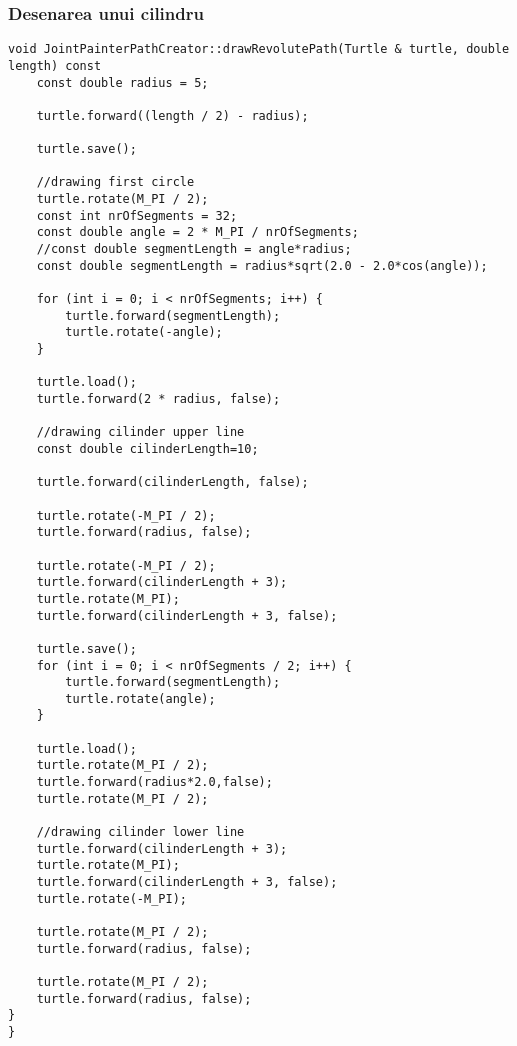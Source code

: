 \subsubsection{Desenarea unui cilindru}
\begin{lstlisting}
void JointPainterPathCreator::drawRevolutePath(Turtle & turtle, double length) const
    const double radius = 5;

    turtle.forward((length / 2) - radius);

    turtle.save();
    
    //drawing first circle
    turtle.rotate(M_PI / 2);
    const int nrOfSegments = 32;
    const double angle = 2 * M_PI / nrOfSegments;
    //const double segmentLength = angle*radius;
    const double segmentLength = radius*sqrt(2.0 - 2.0*cos(angle));

    for (int i = 0; i < nrOfSegments; i++) {
        turtle.forward(segmentLength);
        turtle.rotate(-angle);
    }

    turtle.load();
    turtle.forward(2 * radius, false);

    //drawing cilinder upper line
    const double cilinderLength=10;

    turtle.forward(cilinderLength, false);

    turtle.rotate(-M_PI / 2);
    turtle.forward(radius, false);

    turtle.rotate(-M_PI / 2);
    turtle.forward(cilinderLength + 3);
    turtle.rotate(M_PI);
    turtle.forward(cilinderLength + 3, false);

    turtle.save();
    for (int i = 0; i < nrOfSegments / 2; i++) {
        turtle.forward(segmentLength);
        turtle.rotate(angle);
    }

    turtle.load();
    turtle.rotate(M_PI / 2);
    turtle.forward(radius*2.0,false);
    turtle.rotate(M_PI / 2);

    //drawing cilinder lower line
    turtle.forward(cilinderLength + 3);
    turtle.rotate(M_PI);
    turtle.forward(cilinderLength + 3, false);
    turtle.rotate(-M_PI);

    turtle.rotate(M_PI / 2);
    turtle.forward(radius, false);

    turtle.rotate(M_PI / 2);
    turtle.forward(radius, false);
}
}
\end{lstlisting}
